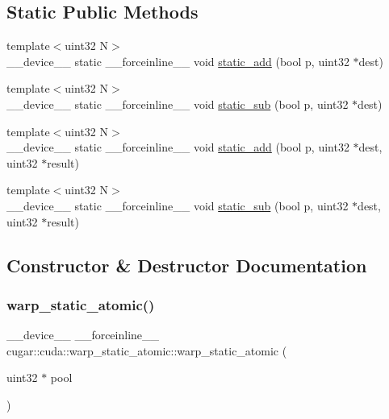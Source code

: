\subsection*{Static Public Methods}
\begin{DoxyCompactItemize}
\item 
{\footnotesize template$<$uint32 N$>$ }\\\+\_\+\+\_\+device\+\_\+\+\_\+ static \+\_\+\+\_\+forceinline\+\_\+\+\_\+ void \hyperlink{structcugar_1_1cuda_1_1warp__static__atomic_a2e8efd252f9f489e242e6724b41ed67a}{static\+\_\+add} (bool p, uint32 $\ast$dest)
\item 
{\footnotesize template$<$uint32 N$>$ }\\\+\_\+\+\_\+device\+\_\+\+\_\+ static \+\_\+\+\_\+forceinline\+\_\+\+\_\+ void \hyperlink{structcugar_1_1cuda_1_1warp__static__atomic_aa11c59ce620f79ebc846bf9844cc98a6}{static\+\_\+sub} (bool p, uint32 $\ast$dest)
\item 
{\footnotesize template$<$uint32 N$>$ }\\\+\_\+\+\_\+device\+\_\+\+\_\+ static \+\_\+\+\_\+forceinline\+\_\+\+\_\+ void \hyperlink{structcugar_1_1cuda_1_1warp__static__atomic_aeba3edd9b324231a90e45675e46a565d}{static\+\_\+add} (bool p, uint32 $\ast$dest, uint32 $\ast$result)
\item 
{\footnotesize template$<$uint32 N$>$ }\\\+\_\+\+\_\+device\+\_\+\+\_\+ static \+\_\+\+\_\+forceinline\+\_\+\+\_\+ void \hyperlink{structcugar_1_1cuda_1_1warp__static__atomic_aa413c0a7545f07ac43aa5731d733318b}{static\+\_\+sub} (bool p, uint32 $\ast$dest, uint32 $\ast$result)
\end{DoxyCompactItemize}


\subsection{Constructor \& Destructor Documentation}
\mbox{\label{structcugar_1_1cuda_1_1warp__static__atomic_a75857fc958928db43b9f4c402fdbbfe8}} 
\subsubsection{\texorpdfstring{warp\+\_\+static\+\_\+atomic()}{warp\_static\_atomic()}}
{\footnotesize\ttfamily \+\_\+\+\_\+device\+\_\+\+\_\+ \+\_\+\+\_\+forceinline\+\_\+\+\_\+ cugar\+::cuda\+::warp\+\_\+static\+\_\+atomic\+::warp\+\_\+static\+\_\+atomic (\begin{DoxyParamCaption}\item[{uint32 $\ast$}]{pool }\end{DoxyParamCaption})\hspace{0.3cm}{\ttfamily [inline]}}

